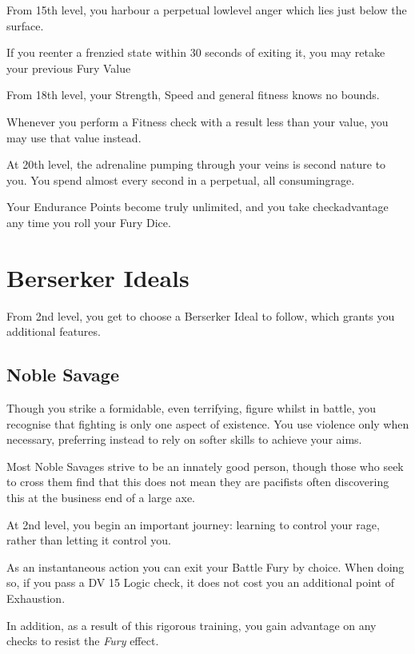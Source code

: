 {
	From 15th level, you harbour a perpetual low\minus{}level anger which lies just below the surface. 
	
	If you re\minus{}enter a frenzied state within 30 seconds of exiting it, you may retake your previous Fury Value
}

{
	From 18th level, your Strength, Speed and general fitness knows no bounds. 
	
	Whenever you perform a Fitness check with a result less than your \attPhys{} value, you may use that value instead. 
}

{
	At 20th level, the adrenaline pumping through your veins is second nature to you. You spend almost every second in a perpetual, all consuming\minus{}rage. 
	
	Your Endurance Points become truly unlimited, and you take check\minus{}advantage any time you roll your Fury Dice. 
}


\section*{Berserker Ideals}

From 2nd level, you get to choose a Berserker Ideal to follow, which grants you additional features. 

\subsection*{Noble Savage}

Though you strike a formidable, even terrifying, figure whilst in battle, you recognise that fighting is only one aspect of existence. You use violence only when necessary, preferring instead to rely on softer skills to achieve your aims. 

Most Noble Savages strive to be an innately good person, though those who seek to cross them find that this does not mean they are pacifists \minus{} often discovering this at the business end of a large axe. 


{
	At 2nd level, you begin an important journey: learning to control your rage, rather than letting it control you. 
	
	As an instantaneous action you can exit your Battle Fury by choice. When doing so, if you pass a DV 15 Logic check, it does not cost you an additional point of Exhaustion.

	In addition, as a result of this rigorous training, you gain advantage on any checks to resist the {\it Fury} effect. 
}

